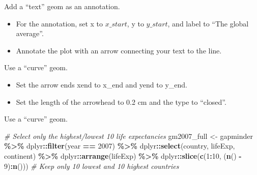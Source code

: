 \documentclass[
  ignorenonframetext,
]{beamer}
\newenvironment{Shaded}{\begin{snugshade}}{\end{snugshade}}
\newcommand{\CommentTok}[1]{\textcolor[rgb]{0.56,0.35,0.01}{\textit{#1}}}
\newcommand{\DecValTok}[1]{\textcolor[rgb]{0.00,0.00,0.81}{#1}}
\newcommand{\FunctionTok}[1]{\textcolor[rgb]{0.13,0.29,0.53}{\textbf{#1}}}
\newcommand{\NormalTok}[1]{#1}
\newcommand{\OtherTok}[1]{\textcolor[rgb]{0.56,0.35,0.01}{#1}}
\newcommand{\SpecialCharTok}[1]{\textcolor[rgb]{0.81,0.36,0.00}{\textbf{#1}}}
\providecommand{\tightlist}{%
  \setlength{\itemsep}{0pt}\setlength{\parskip}{0pt}}
\begin{document}
\begin{frame}{Add a ``text'' geom as an annotation.}
\label{add-a-text-geom-as-an-annotation.}
\begin{itemize}
\tightlist
\item
  For the annotation, set x to \(x\_start\), y to \(y\_start\), and
  label to ``The global average''.
\item
  Annotate the plot with an arrow connecting your text to the line.
\end{itemize}
\end{frame}

\begin{frame}{Use a ``curve'' geom.}
\label{use-a-curve-geom.}
\begin{itemize}
\tightlist
\item
  Set the arrow ends xend to x\_end and yend to y\_end.
\item
  Set the length of the arrowhead to 0.2 cm and the type to ``closed''.
\end{itemize}
\end{frame}

\begin{frame}[fragile]{Use a ``curve'' geom.}
\label{use-a-curve-geom.-1}

\begin{Shaded}
\begin{Highlighting}[]
\CommentTok{\# Select only the highest/lowest 10 life expectancies}
\NormalTok{gm2007\_full }\OtherTok{\textless{}{-}}\NormalTok{ gapminder }\SpecialCharTok{\%\textgreater{}\%}
\NormalTok{    dplyr}\SpecialCharTok{::}\FunctionTok{filter}\NormalTok{(year }\SpecialCharTok{==} \DecValTok{2007}\NormalTok{) }\SpecialCharTok{\%\textgreater{}\%}
\NormalTok{    dplyr}\SpecialCharTok{::}\FunctionTok{select}\NormalTok{(country, lifeExp, continent) }\SpecialCharTok{\%\textgreater{}\%}
\NormalTok{    dplyr}\SpecialCharTok{::}\FunctionTok{arrange}\NormalTok{(lifeExp) }\SpecialCharTok{\%\textgreater{}\%}
\NormalTok{    dplyr}\SpecialCharTok{::}\FunctionTok{slice}\NormalTok{(}\FunctionTok{c}\NormalTok{(}\DecValTok{1}\SpecialCharTok{:}\DecValTok{10}\NormalTok{, (}\FunctionTok{n}\NormalTok{() }\SpecialCharTok{{-}} \DecValTok{9}\NormalTok{)}\SpecialCharTok{:}\FunctionTok{n}\NormalTok{()))  }\CommentTok{\# Keep only 10 lowest and 10 highest countries}
\end{Highlighting}
\end{Shaded}
\end{frame}
\end{document}
